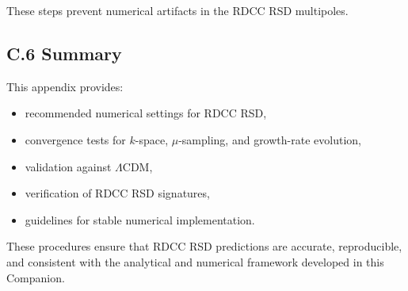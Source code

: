 \documentclass[11pt,a4paper]{article}
\begin{document}
These steps prevent numerical artifacts in the RDCC RSD multipoles.

\subsection*{C.6 Summary}

This appendix provides:
\begin{itemize}
\item recommended numerical settings for RDCC RSD,
\item convergence tests for $k$-space, $\mu$-sampling, and growth-rate evolution,
\item validation against $\Lambda$CDM,
\item verification of RDCC RSD signatures,
\item guidelines for stable numerical implementation.
\end{itemize}

These procedures ensure that RDCC RSD predictions are accurate, reproducible, and
consistent with the analytical and numerical framework developed in this Companion.
\end{document}

